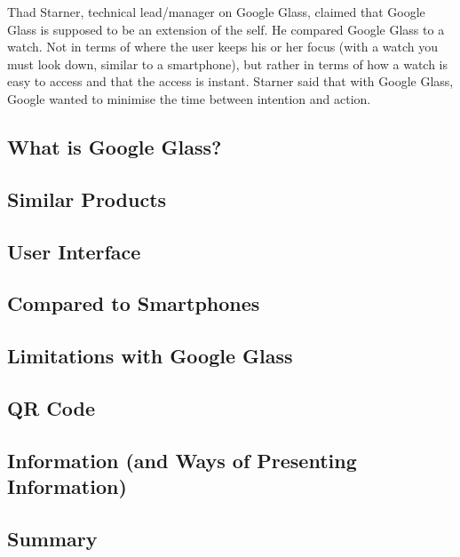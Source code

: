 Thad Starner, technical lead/manager on Google Glass, claimed that Google Glass is supposed to be an extension of the self.\cite{6504855} He compared Google Glass to a watch. Not in terms of where the user keeps his or her focus (with a watch you must look down, similar to a smartphone), but rather in terms of how a watch is easy to access and that the access is instant. Starner said that with Google Glass, Google wanted to minimise the time between intention and action. 


\subsection{What is Google Glass?}
\label{subsec:googleglass}


\subsection{Similar Products}
\label{subsec:similarproducts}


\subsection{User Interface}
\label{subsec:userinterface}


\subsection{Compared to Smartphones}
\label{comparedtophones}


\subsection{Limitations with Google Glass}
\label{subsec:limitations}


\subsection{QR Code}
\label{subsec:qrcode}


\subsection{Information (and Ways of Presenting Information)}
\label{subsec:information}


\subsection{Summary}
\label{subsec:summary}



